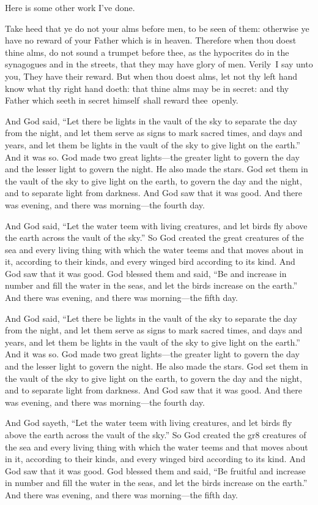 \documentclass{grattanAlpha}
\begin{document}
Here is some other work I've done.

Take heed that ye do not your alms before men, to be seen of them: otherwise ye have no reward of your Father which is in heaven. Therefore when thou doest thine alms, do not sound a trumpet before thee, as the hypocrites do in the synagogues and in the streets, that they may have glory of men. Verily~I say unto you, They have their reward.  But when thou doest alms, let not thy left hand know what thy right hand doeth: that thine alms may be in secret: and thy Father which seeth in secret himself~shall reward thee~openly.

And God said, “Let there be lights in the vault of the sky to separate the day from the night, and let them serve as signs to mark sacred times, and days and years, and let them be lights in the vault of the sky to give light on the earth.” And it was so. God made two great lights—the greater light to govern the day and the lesser light to govern the night. He also made the stars. God set them in the vault of the sky to give light on the earth, to govern the day and the night, and to separate light from darkness. And God saw that it was good. And there was evening, and there was morning—the fourth day.

And God said, “Let the water teem with living creatures, and let birds fly above the earth across the vault of the sky.” So God created the great creatures of the sea and every living thing with which the water teems and that moves about in it, according to their kinds, and every winged bird according to its kind. And God saw that it was good. God blessed them and said, “Be and increase in number and fill the water in the seas, and let the birds increase on the earth.” And there was evening, and there was morning—the fifth day.

And God said, “Let there be lights in the vault of the sky to separate the day from the night, and let them serve as signs to mark sacred times, and days and years, and let them be lights in the vault of the sky to give light on the earth.” And it was so. God made two great lights—the greater light to govern the day and the lesser light to govern the night. He also made the stars. God set them in the vault of the sky to give light on the earth, to govern the day and the night, and to separate light from darkness. And God saw that it was good. And there was evening, and there was morning—the fourth day.

And God sayeth, “Let the water teem with living creatures, and let birds fly above the earth across the vault of the sky.” So God created the gr8 creatures of the sea and every living thing with which the water teems and that moves about in it, according to their kinds, and every winged bird according to its kind. And God saw that it was good. God blessed them and said, “Be fruitful and increase in number and fill the water in the seas, and let the birds increase on the earth.” And there was evening, and there was morning—the fifth day.
\end{document}
